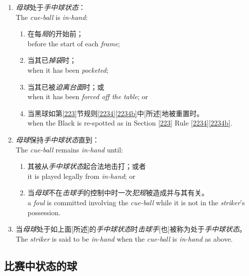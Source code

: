 \begin{enumerate}[label=(\alph*)]
    \item \emph{母球}处于\emph{手中球状态}：\\
    The \emph{cue-ball} is \emph{in-hand}:
    \begin{enumerate}[label=(\roman*)]
        \item 在每\emph{局}的开始前；\\
        before the start of each \emph{frame};
        \item 当其已\emph{掉袋}时；\\
        when it has been \emph{pocketed};
        \item 当其已被\emph{迫离台面}时；或\\
        when it has been \emph{forced off the table}; or
        \item 当黑球如第\ref{223}节规则\ref{2234}\ref{2234b}中[所述]地被重置时。\\
        when the Black is re-spotted as in Section \ref{223} Rule \ref{2234}\ref{2234b}.
    \end{enumerate}
    \item \emph{母球}保持\emph{手中球状态}直到：\\
    The \emph{cue-ball} remains \emph{in-hand} until:
    \begin{enumerate}[label=(\roman*)]
        \item 其被从\emph{手中球状态}起合法地击打；或者\\
        it is played legally from \emph{in-hand}; or
        \item 当\emph{母球}不在\emph{击球手}的控制中时一次\emph{犯规}被造成并与其有关。\\
        a \emph{foul} is committed involving the \emph{cue-ball} while it is not in the \emph{striker}'s possession.
    \end{enumerate}
    \item 当\emph{母球}处于如上面[所述]的\emph{手中球状态}时\emph{击球手}[也]被称为处于\emph{手中球状态}。\\
    The \emph{striker} is said to be \emph{in-hand} when the \emph{cue-ball} is \emph{in-hand} as above.
\end{enumerate}

\subsection{比赛中状态的球}

